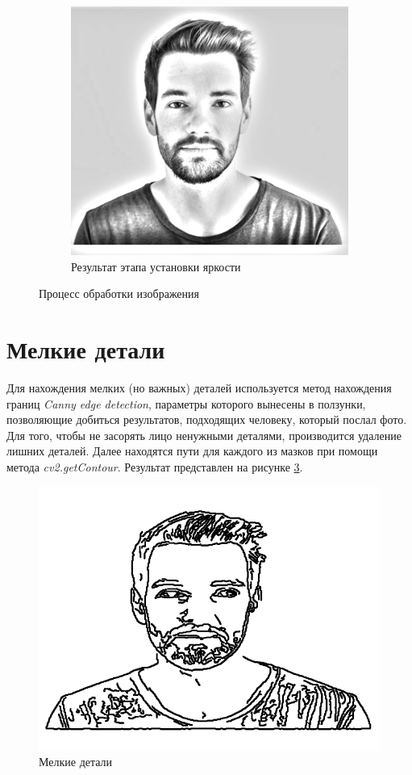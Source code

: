 \documentclass[a4paper, 11pt]{article}
\begin{document}
\begin{figure}[h!]
\begin{subfigure}{0.49\linewidth}
		\includegraphics[width=\linewidth]{"adjust_brightness.png"}
		\caption{Результат этапа установки яркости} \label{adj_br}
	\end{subfigure}
	\caption{Процесс обработки изображения}
\end{figure}

\section{Мелкие детали}
Для нахождения мелких (но важных) деталей используется метод нахождения границ \textit{Canny edge detection}, параметры которого вынесены в ползунки, позволяющие добиться результатов, подходящих человеку, который послал фото. Для того, чтобы не засорять лицо ненужными деталями, производится удаление лишних деталей. Далее находятся пути для каждого из мазков при помощи метода \textit{cv2.getContour}. Результат представлен на рисунке \ref{canny}.
\begin{figure}[h!]
	\centering
	\includegraphics[width=0.5\linewidth]{"canny.png"}
	\caption{Мелкие детали} \label{canny}
\end{figure}
\end{document}
